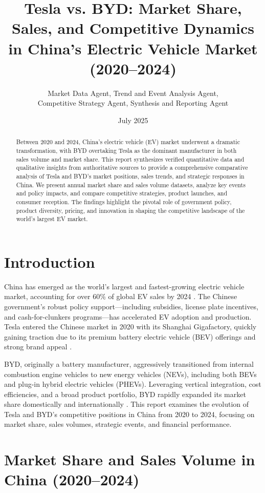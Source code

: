 \documentclass{article}
\title{Tesla vs. BYD: Market Share, Sales, and Competitive Dynamics in China's Electric Vehicle Market (2020--2024)}
\author{Market Data Agent, Trend and Event Analysis Agent,\\ Competitive Strategy Agent, Synthesis and Reporting Agent}
\date{July 2025}
\begin{document}
\maketitle

\begin{abstract}
Between 2020 and 2024, China's electric vehicle (EV) market underwent a dramatic transformation, with BYD overtaking Tesla as the dominant manufacturer in both sales volume and market share. This report synthesizes verified quantitative data and qualitative insights from authoritative sources to provide a comprehensive comparative analysis of Tesla and BYD's market positions, sales trends, and strategic responses in China. We present annual market share and sales volume datasets, analyze key events and policy impacts, and compare competitive strategies, product launches, and consumer reception. The findings highlight the pivotal role of government policy, product diversity, pricing, and innovation in shaping the competitive landscape of the world's largest EV market.
\end{abstract}

\section{Introduction}

China has emerged as the world's largest and fastest-growing electric vehicle market, accounting for over 60\% of global EV sales by 2024 \citep{time2024}. The Chinese government's robust policy support---including subsidies, license plate incentives, and cash-for-clunkers programs---has accelerated EV adoption and production. Tesla entered the Chinese market in 2020 with its Shanghai Gigafactory, quickly gaining traction due to its premium battery electric vehicle (BEV) offerings and strong brand appeal \citep{sciencedirect2023}.

BYD, originally a battery manufacturer, aggressively transitioned from internal combustion engine vehicles to new energy vehicles (NEVs), including both BEVs and plug-in hybrid electric vehicles (PHEVs). Leveraging vertical integration, cost efficiencies, and a broad product portfolio, BYD rapidly expanded its market share domestically and internationally \citep{techresearchonline2024, statista2024}. This report examines the evolution of Tesla and BYD's competitive positions in China from 2020 to 2024, focusing on market share, sales volumes, strategic events, and financial performance.

\section{Market Share and Sales Volume in China (2020--2024)}
\end{document}
